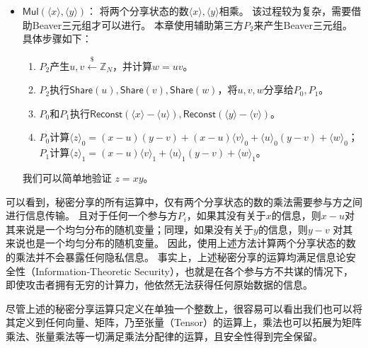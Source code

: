 \begin{itemize}
    \item $\mathsf{Mul}(\langle x \rangle, \langle y \rangle)$：
    将两个分享状态的数$\langle x \rangle, \langle y \rangle$相乘。
    该过程较为复杂，需要借助Beaver三元组才可以进行。
    本章使用辅助第三方$P_2$来产生Beaver三元组。
    具体步骤如下：
    \begin{enumerate}
        \item $P_2$产生$u, v\stackrel{\$}{\gets} \mathbb Z_N$，并计算$w = uv$。
        
        \item $P_2$执行$\mathsf{Share}(u), \mathsf{Share}(v), \mathsf{Share}(w)$，将$u, v, w$分享给$P_0, P_1$。
        
        \item $P_0$和$P_1$执行$\mathsf{Reconst}(\langle x \rangle - \langle u \rangle), \mathsf{Reconst}(\langle y \rangle - \langle v \rangle)$。

        \item $P_0$计算$\langle  z \rangle_0 = (x - u)(y - v) + (x - u)\langle v \rangle_0 + \langle u \rangle_0 (y - v) + \langle w \rangle_0$；$P_1$计算$\langle  z \rangle_1 = (x - u)\langle v \rangle_1 + \langle u \rangle_1 (y - v) + \langle w \rangle_1$。
    \end{enumerate}
    我们可以简单地验证 $z = xy$。
\end{itemize}

可以看到，秘密分享的所有运算中，仅有两个分享状态的数的乘法需要参与方之间进行信息传输。
%
且对于任何一个参与方$P_i$，如果其没有关于$x$的信息，则$x - u$对其来说是一个均匀分布的随机变量；同理，如果没有关于$y$的信息，则$y - v$ 对其来说也是一个均匀分布的随机变量。
%
因此，使用上述方法计算两个分享状态的数的乘法并不会暴露任何隐私信息。
%
事实上，上述秘密分享的运算均满足信息论安全性（Information-Theoretic Security），也就是在各个参与方不共谋的情况下，即使攻击者拥有无穷的计算力，他依然无法获得任何原始数据的信息\cite{beaver1992efficient}。

尽管上述的秘密分享运算只定义在单独一个整数上，很容易可以看出我们也可以将其定义到任何向量、矩阵，乃至张量（Tensor）的运算上，乘法也可以拓展为矩阵乘法、张量乘法等一切满足乘法分配律的运算，且安全性得到完全保留。

